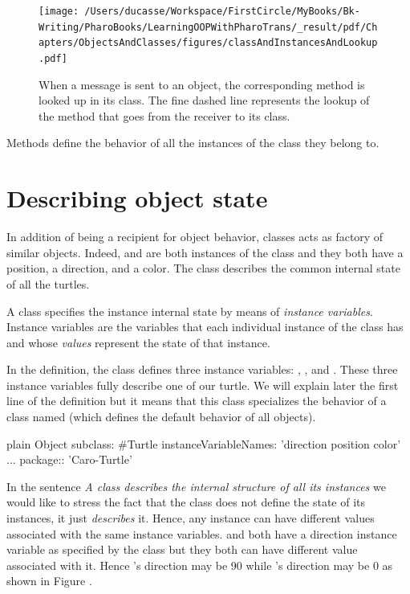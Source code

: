 \documentclass[10pt,twoside,english]{_support/latex/sbabook/sbabook}
\begin{document}
\begin{figure}

\begin{center}
\texttt{[image: /Users/ducasse/Workspace/FirstCircle/MyBooks/Bk-Writing/PharoBooks/LearningOOPWithPharoTrans/\_result/pdf/Chapters/ObjectsAndClasses/figures/classAndInstancesAndLookup.pdf]}\caption{When a message is sent to an object, the corresponding method is looked up in its class. The fine dashed line represents the lookup of the method that goes from the receiver to its class.\label{fig:classAndInstancesAndLookup}}\end{center}
\end{figure}


\begin{important}
Methods define the behavior of all the instances of the class they belong to.
\end{important}
\section{Describing object state}
In addition of being a recipient for object behavior, classes acts as
factory of similar objects. Indeed,  and  are both instances of the class  and they
both have a position, a direction, and a color. The class  describes the common internal state of all the turtles.

A class specifies the instance internal state by means of \textit{instance variables}. Instance variables are the variables that each individual instance of the class has and whose \textit{values} represent the state of that instance.

In the definition, the class  defines three instance variables: , , and . These three instance variables fully describe one of our turtle. We will explain later the first line of the definition but it means that this class specializes the behavior of a class named  (which defines the default behavior of all objects).

\begin{displaycode}{plain}
Object subclass: #Turtle
	instanceVariableNames: 'direction position color'
	...
    package:: 'Caro-Turtle'
\end{displaycode}

In the sentence \textit{A class describes the internal structure of all its instances}  we would like to stress the fact that the class does not define the state of its instances, it just \textit{describes} it. Hence, any instance can have different values associated with the same instance variables.  and  both have a direction instance variable as specified by the class  but they both can have different value associated with it. Hence 's direction may be 90 while 's direction may be 0 as shown in Figure .
\end{document}

